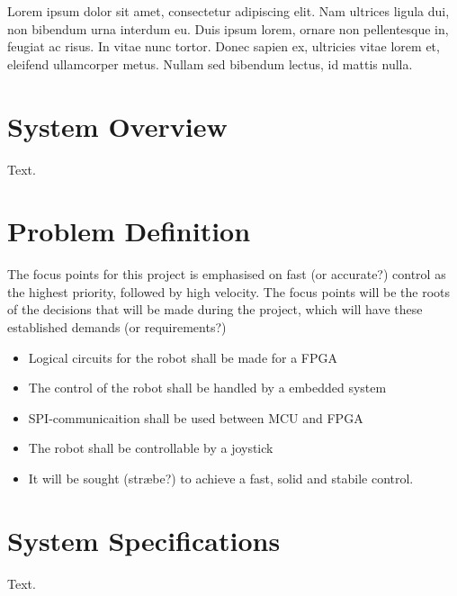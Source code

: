 Lorem ipsum dolor sit amet, consectetur adipiscing elit. Nam ultrices ligula dui, non bibendum urna interdum eu. Duis ipsum lorem, ornare non pellentesque in, feugiat ac risus. In vitae nunc tortor. Donec sapien ex, ultricies vitae lorem et, eleifend ullamcorper metus. Nullam sed bibendum lectus, id mattis nulla.

\section{System Overview}
Text.

\section{Problem Definition}
The focus points for this project is emphasised on fast (or accurate?) control as the highest priority, followed by high velocity. The focus points will be the roots of the decisions that will be made during the project, which will have these established demands (or requirements?)
\begin{itemize}
    \item Logical circuits for the robot shall be made for a FPGA
    \item The control of the robot shall be handled by a embedded system
    \item SPI-communicaition shall be used between MCU and FPGA
    \item The robot shall be controllable by a joystick
    \item It will be sought (stræbe?) to achieve a fast, solid and stabile control.
\end{itemize}

\section{System Specifications}
Text.